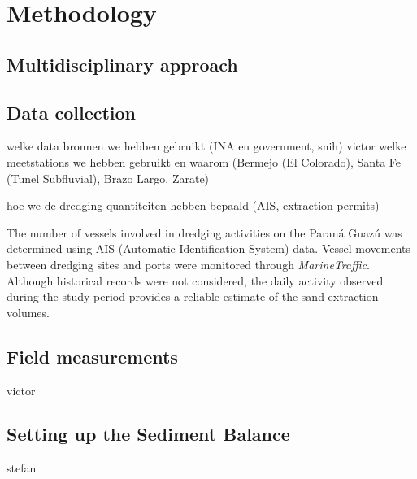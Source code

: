 \chapter{Methodology}

\section{Multidisciplinary approach}

\section{Data collection}
welke data bronnen we hebben gebruikt (INA en government, snih)
victor
welke meetstations we hebben gebruikt en waarom (Bermejo (El Colorado), Santa Fe (Tunel Subfluvial), Brazo Largo, Zarate)

hoe we de dredging quantiteiten hebben bepaald (AIS, extraction permits)

The number of vessels involved in dredging activities on the Paraná Guazú was determined using AIS (Automatic Identification System) data. Vessel movements between dredging sites and ports were monitored through \textit{MarineTraffic}. Although historical records were not considered, the daily activity observed during the study period provides a reliable estimate of the sand extraction volumes. 




\section{Field measurements}
victor

\section{Setting up the Sediment Balance}
stefan